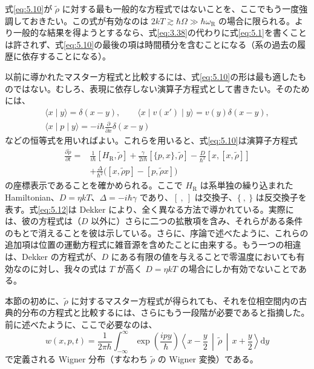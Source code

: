 式\eqref{eq:5.10}が $\tilde\rho$ に対する最も一般的な方程式ではないことを、ここでもう一度強調しておきたい。この式が有効なのは $2kT\gtrsim\hbar\Omega\gg\hbar\omega_{\mathrm R}$ の場合に限られる。より一般的な結果を得ようとするなら、式\eqref{eq:3.38}の代わりに式\eqref{eq:5.1}を書くことは許されず、式\eqref{eq:5.10}の最後の項は時間積分を含むことになる（系の過去の履歴に依存することになる）。

以前に導かれたマスター方程式と比較するには、式\eqref{eq:5.10}の形は最も適したものではない。むしろ、表現に依存しない演算子方程式として書きたい。そのためには、
\begin{equation}
\begin{gathered}
\langle x\mid y\rangle=\delta(x-y),\qquad
\langle x\mid v(x')\mid y\rangle=v(y)\delta(x-y),\\
\langle x\mid p\mid y\rangle=-i\hbar\frac{\partial}{\partial x}\delta(x-y)
\end{gathered}
\tag{5.11}\label{eq:5.11}
\end{equation}
などの恒等式を用いればよい。これらを用いると、式\eqref{eq:5.10}は演算子方程式
\begin{equation}
\begin{aligned}
\frac{\partial\tilde\rho}{\partial t}={}&
\frac{1}{i\hbar}[H_{\mathrm R},\tilde\rho]
+\frac{\gamma}{2i\hbar}[\{p,x\},\tilde\rho]
-\frac{D}{\hbar^2}[x,[x,\tilde\rho]]\\
&+\frac{\Delta}{\hbar^2}\bigl([x,\tilde\rho p]-[p,\tilde\rho x]\bigr)
\end{aligned}
\tag{5.12}\label{eq:5.12}
\end{equation}
の座標表示であることを確かめられる。ここで $H_{\mathrm R}$ は系単独の繰り込まれた Hamiltonian、$D=\eta kT$、$\Delta=-i\hbar\gamma$ であり、$[\ ,\ ]$ は交換子、$\{\ ,\ \}$ は反交換子を表す。式\eqref{eq:5.12}は Dekker\cite{ref07} により、全く異なる方法で導かれている。実際には、彼の方程式は（$D$ 以外に）さらに二つの拡散項を含み、それらがある条件のもとで消えることを彼は示している。さらに、序論で述べたように、これらの追加項は位置の運動方程式に雑音源を含めたことに由来する。もう一つの相違は、Dekker の方程式が、$D$ にある有限の値を与えることで零温度においても有効なのに対し、我々の式は $T$ が高く $D=\eta kT$ の場合にしか有効でないことである。

本節の初めに、$\tilde\rho$ に対するマスター方程式が得られても、それを位相空間内の古典的分布の方程式と比較するには、さらにもう一段階が必要であると指摘した。前に述べたように、ここで必要なのは、
\begin{equation}
w(x,p,t)=\frac{1}{2\pi\hbar}\int_{-\infty}^{\infty}
\exp\!\left(\frac{ipy}{\hbar}\right)
\left\langle x-\frac y2\,\middle|\,\tilde\rho\,\middle|\,x+\frac y2\right\rangle\mathrm dy
\tag{5.13}\label{eq:5.13}
\end{equation}
で定義される Wigner 分布（すなわち $\tilde\rho$ の Wigner 変換）である。


